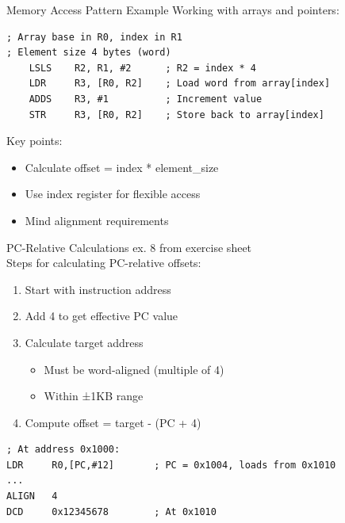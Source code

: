 \begin{example2}{Memory Access Pattern Example}
Working with arrays and pointers:
\begin{lstlisting}[language=armasm, style=basesmol]
; Array base in R0, index in R1
; Element size 4 bytes (word)
    LSLS    R2, R1, #2      ; R2 = index * 4
    LDR     R3, [R0, R2]    ; Load word from array[index]
    ADDS    R3, #1          ; Increment value
    STR     R3, [R0, R2]    ; Store back to array[index]
\end{lstlisting}
\small
Key points:
\begin{itemize}
  \item Calculate offset = index * element\_size
  \item Use index register for flexible access
  \item Mind alignment requirements
\end{itemize}
\end{example2}



\begin{KR}{PC-Relative Calculations} ex. 8 from exercise sheet\\
Steps for calculating PC-relative offsets:
\begin{enumerate}
  \item Start with instruction address
  \item Add 4 to get effective PC value
  \item Calculate target address
    \begin{itemize}
      \item Must be word-aligned (multiple of 4)
      \item Within ±1KB range
    \end{itemize}
  \item Compute offset = target - (PC + 4)
\end{enumerate}
\begin{lstlisting}[language=armasm, style=basesmol]
; At address 0x1000:
LDR     R0,[PC,#12]       ; PC = 0x1004, loads from 0x1010
...
ALIGN   4
DCD     0x12345678        ; At 0x1010
\end{lstlisting}
\end{KR}

